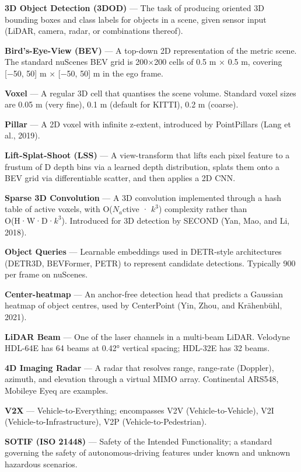 \textbf{3D Object Detection (3DOD)} --- The task of producing oriented 3D bounding boxes and class labels for objects in a scene, given sensor input (LiDAR, camera, radar, or combinations thereof).

\textbf{Bird's-Eye-View (BEV)} --- A top-down 2D representation of the metric scene. The standard nuScenes BEV grid is 200×200 cells of 0.5 m × 0.5 m, covering {[}−50, 50{]} m × {[}−50, 50{]} m in the ego frame.

\textbf{Voxel} --- A regular 3D cell that quantises the scene volume. Standard voxel sizes are 0.05 m (very fine), 0.1 m (default for KITTI), 0.2 m (coarse).

\textbf{Pillar} --- A 2D voxel with infinite z-extent, introduced by PointPillars (Lang et al., 2019).

\textbf{Lift-Splat-Shoot (LSS)} --- A view-transform that lifts each pixel feature to a frustum of D depth bins via a learned depth distribution, splats them onto a BEV grid via differentiable scatter, and then applies a 2D CNN.

\textbf{Sparse 3D Convolution} --- A 3D convolution implemented through a hash table of active voxels, with O(\(N_a\)ctive · \(k^3\)) complexity rather than O(H·W·D·\(k^3\)). Introduced for 3D detection by SECOND (Yan, Mao, and Li, 2018).

\textbf{Object Queries} --- Learnable embeddings used in DETR-style architectures (DETR3D, BEVFormer, PETR) to represent candidate detections. Typically 900 per frame on nuScenes.

\textbf{Center-heatmap} --- An anchor-free detection head that predicts a Gaussian heatmap of object centres, used by CenterPoint (Yin, Zhou, and Krähenbühl, 2021).

\textbf{LiDAR Beam} --- One of the laser channels in a multi-beam LiDAR. Velodyne HDL-64E has 64 beams at 0.42° vertical spacing; HDL-32E has 32 beams.

\textbf{4D Imaging Radar} --- A radar that resolves range, range-rate (Doppler), azimuth, and elevation through a virtual MIMO array. Continental ARS548, Mobileye Eyeq are examples.

\textbf{V2X} --- Vehicle-to-Everything; encompasses V2V (Vehicle-to-Vehicle), V2I (Vehicle-to-Infrastructure), V2P (Vehicle-to-Pedestrian).

\textbf{SOTIF (ISO 21448)} --- Safety of the Intended Functionality; a standard governing the safety of autonomous-driving features under known and unknown hazardous scenarios.

